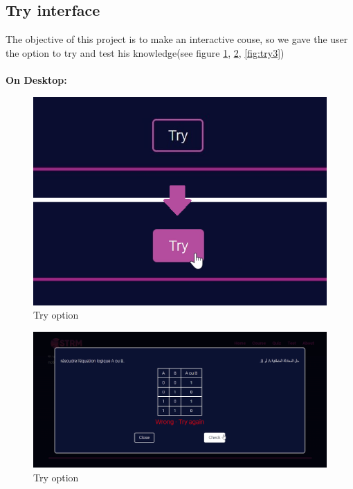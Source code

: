 \subsection{Try interface}
The objective of this project is to make an interactive couse, so we gave the user the option to try and test his knowledge(see figure \ref{fig:try1}, \ref{fig:try2}, \ref{fig:try3})\\\\
\textbf{On Desktop:}
\begin{figure}[ht]
	\centering
	\label{}\includegraphics[scale=0.6]{img/13.png}                
	\caption{Try option} 
	\label{fig:try1}
\end{figure} 



\newpage

\begin{figure}[ht]
	\centering
	\label{}\includegraphics[scale=0.5]{img/11.png}                
	\caption{Try option} 
	\label{fig:try2}
\end{figure} 


